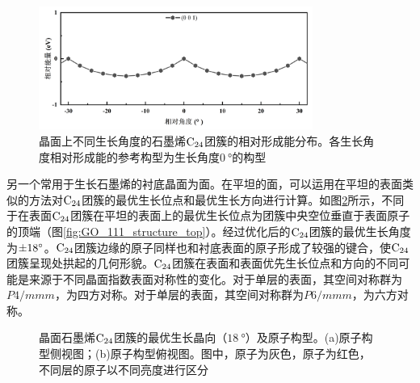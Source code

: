 \begin{figure}[htb]
    \includegraphics[width=0.8\textwidth]{pic/GO_C24_flat_001_energy.png}
    \caption{晶面上不同生长角度的石墨烯$\rm{C_{24}}$团簇的相对形成能分布。各生长角度相对形成能的参考构型为生长角度$\SI{0}{\degree}$的构型}
    \label{fig:GO_001_energy}
\end{figure}

另一个常用于生长石墨烯的衬底晶面为面。在平坦的面，可以运用在平坦的表面类似的方法对$\rm{C_{24}}$团簇的最优生长位点和最优生长方向进行计算。如图\ref{fig:GO_111_structure}所示，不同于在表面$\rm{C_{24}}$团簇在平坦的表面上的最优生长位点为团簇中央空位垂直于表面原子的顶端（图\ref{fig:GO_111_structure_top}）。经过优化后的$\rm{C_{24}}$团簇的最优生长角度为$\SI{\pm 18}{\degree}$。$\rm{C_{24}}$团簇边缘的原子同样也和衬底表面的原子形成了较强的键合，使$\rm{C_{24}}$团簇呈现处拱起的几何形貌。$\rm{C_{24}}$团簇在表面和表面优先生长位点和方向的不同可能是来源于不同晶面指数表面对称性的变化。对于单层的表面，其空间对称群为$P4/mmm$，为四方对称。对于单层的表面，其空间对称群为$P6/mmm$，为六方对称。

\begin{figure}[htb]

    \caption{晶面石墨烯$\rm{C_{24}}$团簇的最优生长晶向（$\SI{18}{\degree}$）及原子构型。(a)原子构型侧视图；(b)原子构型俯视图。图中，原子为灰色，原子为红色，不同层的原子以不同亮度进行区分}

    \label{fig:GO_111_structure}
\end{figure}

